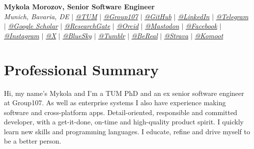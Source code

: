 \documentclass[letterpaper,10pt]{article}
\newcommand{\sectionspace}{
\vspace{-20pt}
}
\begin{document}
	

\begin{flushleft}
    \textbf{\large Mykola Morozov, Senior Software Engineer} \\    
    \textit{Munich, Bavaria, DE} $|$ 
    \href{mailto:mykola.morozov@tum.de}{{\textit{@TUM}}} $|$
    \href{mailto:mykola@group107.com}{{\textit{@Group107}}} $|$
    \href{https://github.com/mykolamor}{{\textit{@GitHub}}} $|$
    \href{https://www.linkedin.com/in/mykola-mor}{{\textit{@LinkedIn}}} $|$
    \href{https://t.me/mykolamor}{{\textit{@Telegram}}} $|$
    \href{https://scholar.google.com/citations?user=MwdhZtkAAAAJ&hl=en}{{\textit{@Google Scholar}}} $|$
    \href{https://www.researchgate.net/profile/Mykola_Morozov3}{{\textit{@ResearchGate}}} $|$
    \href{https://orcid.org/0000-0002-5892-6936}{{\textit{@Orcid}}} $|$
    \href{https://mastodon.social/@mykolamor}{{\textit{@Mastodon}}} $|$
    \href{https://www.facebook.com/mykolamor}{{\textit{@Facebook}}} $|$
    \href{https://www.instagram.com/mykolamor}{{\textit{@Instagram}}} $|$
    \href{https://x.com/MykolaMor}{{\textit{@X}}} $|$
    \href{https://bsky.app/profile/mykolamor.bsky.social}{{\textit{@BlueSky}}} $|$
    \href{https://www.tumblr.com/mykolamor}{{\textit{@Tumblr}}} $|$
    \href{https://bere.al/mykolamor}{{\textit{@BeReal}}} $|$
    \href{https://www.strava.com/athletes/mykolamor}{{\textit{@Strava}}} $|$
    \href{https://www.komoot.com/user/4341478648996}{{\textit{@Komoot}}}
    \vspace{-8pt}
\end{flushleft}
	

\section{Professional Summary}
\vspace{-3pt}
\begin{itemize}[leftmargin=0.15in, label={}]
    {\item{
     {Hi, my name's Mykola and I'm a TUM PhD and an ex senior software engineer at Group107. As well as enterprise systems I also have experience making software and cross-platform apps. Detail-oriented, responsible and committed developer, with a get-it-done, on-time and high-quality product spirit. I quickly learn new skills and programming languages. I educate, refine and drive myself to be a better person.} \\      
    }}
 \end{itemize}
 \sectionspace
	
\end{document}
